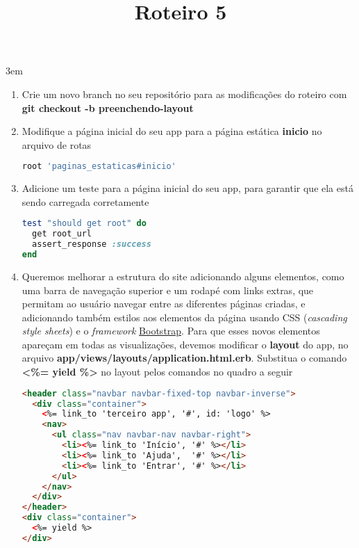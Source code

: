 \documentclass[a4paper,12pt]{article}
\title{Roteiro 5}
\begin{document}
\maketitle

\emergencystretch 3em

\setlength{\leftmargini}{0pt}
\begin{enumerate}
  \item Crie um novo branch no seu repositório para as modificações do roteiro com \textbf{git checkout -b preenchendo-layout}

  \item Modifique a página inicial do seu app para a página estática \textbf{inicio} no arquivo de rotas

  \begin{lstlisting}[language=Ruby, title={config/routes.rb}]
root 'paginas_estaticas#inicio'
  \end{lstlisting}

  \item Adicione um teste para a página inicial do seu app, para garantir que ela está sendo carregada corretamente

  \begin{lstlisting}[language=Ruby, title={test/controllers/paginas\_estaticas\_controller\_test.rb}]
test "should get root" do
  get root_url
  assert_response :success
end
  \end{lstlisting}

  \item Queremos melhorar a estrutura do site adicionando alguns elementos, como uma barra de navegação superior e um rodapé com links extras, que permitam ao usuário navegar entre as diferentes páginas criadas, e adicionando também estilos aos elementos da página usando CSS (\textit{cascading style sheets}) e o \textit{framework} \href{https://getbootstrap.com/docs/3.4/}{Bootstrap}. Para que esses novos elementos apareçam em todas as visualizações, devemos modificar o \textbf{layout} do app, no arquivo \textbf{app/views/layouts/application.html.erb}. Substitua o comando \textbf{<\%= yield \%>} no layout pelos comandos no quadro a seguir

  \begin{lstlisting}[language=html, title={app/views/layouts/application.html.erb}]
<header class="navbar navbar-fixed-top navbar-inverse">
  <div class="container">
    <%= link_to 'terceiro app', '#', id: 'logo' %>
    <nav>
      <ul class="nav navbar-nav navbar-right">
        <li><%= link_to 'Início', '#' %></li>
        <li><%= link_to 'Ajuda',  '#' %></li>
        <li><%= link_to 'Entrar', '#' %></li>
      </ul>
    </nav>
  </div>
</header>
<div class="container">
  <%= yield %>
</div>
  \end{lstlisting}


\end{enumerate}
\end{document}
